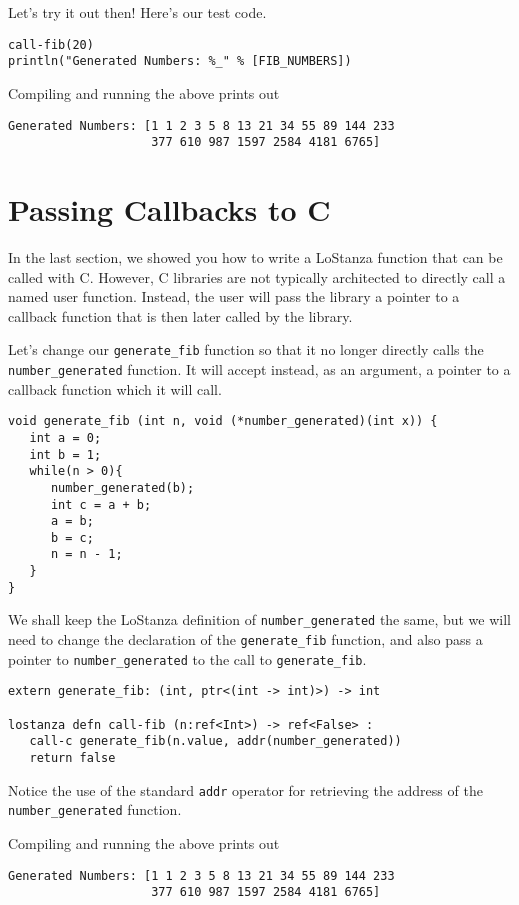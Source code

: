 \documentclass[10pt,oneside]{book}
\begin{document}
Let's try it out then! Here's our test code.
\begin{lstlisting}
call-fib(20)
println("Generated Numbers: %_" % [FIB_NUMBERS])
\end{lstlisting}

Compiling and running the above prints out
\begin{lstlisting}
Generated Numbers: [1 1 2 3 5 8 13 21 34 55 89 144 233
                    377 610 987 1597 2584 4181 6765]
\end{lstlisting}

\section{Passing Callbacks to C}
In the last section, we showed you how to write a LoStanza function that can be called with C. However, C libraries are not typically architected to directly call a named user function. Instead, the user will pass the library a pointer to a callback function that is then later called by the library. 

Let's change our \texttt{\frenchspacing generate\_fib} function so that it no longer directly calls the \texttt{\frenchspacing number\_generated} function. It will accept instead, as an argument, a pointer to a callback function which it will call. 
\begin{lstlisting}
void generate_fib (int n, void (*number_generated)(int x)) {
   int a = 0;
   int b = 1;
   while(n > 0){
      number_generated(b);
      int c = a + b;
      a = b;
      b = c;
      n = n - 1;
   }
}
\end{lstlisting} 

We shall keep the LoStanza definition of \texttt{\frenchspacing number\_generated} the same, but we will need to change the declaration of the \texttt{\frenchspacing generate\_fib} function, and also pass a pointer to \texttt{\frenchspacing number\_generated} to the call to \texttt{\frenchspacing generate\_fib}.
\begin{lstlisting}
extern generate_fib: (int, ptr<(int -> int)>) -> int

lostanza defn call-fib (n:ref<Int>) -> ref<False> :
   call-c generate_fib(n.value, addr(number_generated))
   return false
\end{lstlisting}
Notice the use of the standard \texttt{\frenchspacing addr} operator for retrieving the address of the \texttt{\frenchspacing number\_generated} function.

Compiling and running the above prints out
\begin{lstlisting}
Generated Numbers: [1 1 2 3 5 8 13 21 34 55 89 144 233
                    377 610 987 1597 2584 4181 6765]
\end{lstlisting}
\end{document}
